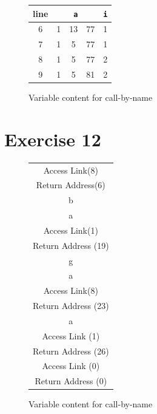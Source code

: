\documentclass[11pt]{article} %
\begin{document}
\begin{figure}[H]
\centering
\begin{tabular}{ccccc}
line & \multicolumn{3}{c}{\texttt{a}} & \texttt{i} \\ 
\hline 
6 & 1 & 13 & 77 & 1 \\ 
7 & 1 & 5 & 77 & 1 \\ 
8 & 1 & 5 & 77 & 2 \\ 
9 & 1 & 5 & 81 & 2 \\ 
\hline 
\end{tabular} 
\caption{Variable content for call-by-name}
\end{figure}

\section*{Exercise 12}
\begin{figure}[H]
\centering
\begin{tabular}{|c|}
\hline 
Access Link(8) \\ 
Return Address(6) \\ 
b \\ 
\hline 
a \\ 
Access Link(1) \\ 
Return Address (19) \\ 
g \\ 
\hline 
a \\ 
Access Link(8) \\ 
Return Address (23) \\
\hline
a \\ 
Access Link (1) \\ 
Return Address (26) \\ 
\hline
Access Link (0) \\ 
Return Address (0) \\ 
\hline 
\end{tabular} 
\caption{Variable content for call-by-name}
\end{figure}
\end{document}
